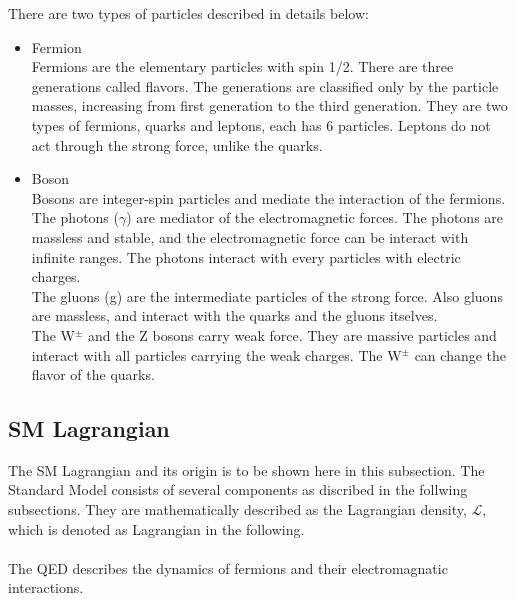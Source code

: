 There are two types of particles described in details below:
\begin{itemize}
    \item Fermion \\
    Fermions are the elementary particles with spin 1/2. There are three generations called flavors. The generations are classified only by the particle masses, increasing from first generation to the third generation. They are two types of fermions, quarks and leptons, each has 6 particles. Leptons do not act through the strong force, unlike the quarks.
    \item Boson \\
    Bosons are integer-spin particles and mediate the interaction of the fermions.
    The photons ($\gamma$) are mediator of the electromagnetic forces. The photons are massless and stable, and the electromagnetic force can be interact with infinite ranges. The photons interact with every particles with electric charges.\\
    The gluons (g) are the intermediate particles of the strong force. Also gluons are massless, and interact with the quarks and the gluons itselves.\\
    The W$^\pm$ and the Z bosons carry weak force. They are massive particles and interact with all particles carrying the weak charges. The W$^\pm$ can change the flavor of the quarks. \\
\end{itemize}

\subsection{SM Lagrangian}
\label{ch:Lagrangian}
The SM Lagrangian and its origin is to be shown here in this subsection. 
The Standard Model consists of several components as discribed in the follwing subsections. They are mathematically described as the Lagrangian density, $\mathcal{L}$, which is denoted as Lagrangian in the following.\\

\noindent\textbf{} \\ 
The QED describes the dynamics of fermions and their electromagnatic interactions.

